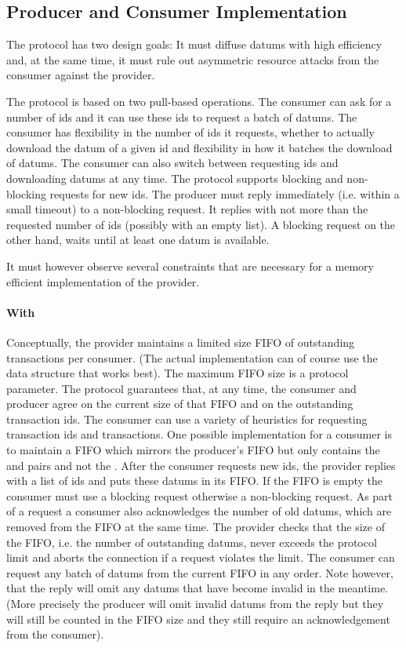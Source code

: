 \subsection{Producer and Consumer Implementation}
The protocol has two design goals: It must diffuse datums with high efficiency
and, at the same time, it must rule out
asymmetric resource attacks from the consumer against the provider.

The protocol is based on two pull-based operations.
The consumer can ask for a number of ids and it can use these
ids to request a batch of datums.
The consumer has flexibility in the number of ids it requests,
whether to actually download the datum of a given id
and flexibility in how it batches the download of datums.
The consumer can also switch between requesting ids and downloading
datums at any time. The protocol supports blocking and non-blocking requests for new ids.
The producer must reply immediately (i.e. within a small timeout) to a non-blocking request.
It replies with not more than the requested number of ids (possibly with an empty list).
A blocking request on the other hand, waits until at least one datum is available.


It must however observe several constraints that are necessary for a
memory efficient implementation of the provider.

\paragraph{With \BoundedWindow{}}
Conceptually, the provider maintains a limited size FIFO of outstanding transactions per consumer.
(The actual implementation can of course use the data structure that works best).
The maximum FIFO size is a protocol parameter.
The protocol guarantees that, at any time, the consumer and producer agree on the current size of
that FIFO and on the outstanding transaction ids.
The consumer can use a variety of heuristics for requesting transaction ids and transactions.
One possible implementation for a consumer is to maintain a FIFO which mirrors the producer's FIFO
but only contains the \id{} and \info{} pairs and not the \datum{}.
%
After the consumer requests new ids, the provider replies with a list of ids and
puts these datums in its FIFO. If the FIFO is empty the consumer must use a blocking
request otherwise a non-blocking request.
As part of a request a consumer also acknowledges the number of old datums,
which are removed from the FIFO at the same time.
The provider checks that the size of the FIFO, i.e. the number of outstanding datums,
never exceeds the protocol limit and aborts the connection if a request violates the limit.
The consumer can request any batch of datums from the current FIFO in any order.
Note however, that the reply will omit any datums that have become invalid in the meantime.
(More precisely the producer will omit invalid datums from the reply but they will still be counted in the FIFO
size and they still require an acknowledgement from the consumer).

